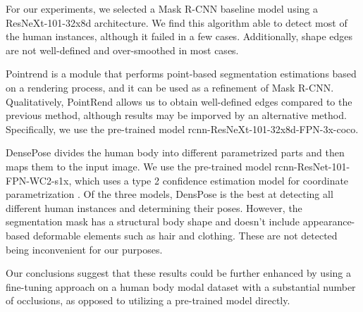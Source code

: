 \documentclass[]{interact}
\theoremstyle{plain}%
\theoremstyle{definition}
\theoremstyle{remark}
\begin{document}

For our experiments, we selected a Mask R-CNN baseline model using a ResNeXt-101-32x8d architecture. We find this algorithm able to detect most of the human instances, although it failed in a few cases. Additionally, shape edges are not well-defined and over-smoothed in most cases.

Pointrend \citep{kirillov2019pointrend} is a module that performs point-based segmentation estimations based on a rendering process, and it can be used as a refinement of Mask R-CNN. Qualitatively, PointRend allows us to obtain well-defined edges compared to the previous method, although results may be imporved by an alternative method. Specifically, we use the pre-trained model rcnn-ResNeXt-101-32x8d-FPN-3x-coco.

DensePose \citep{Guler2018DensePose} divides the human body into different parametrized parts and then maps them to the input image. We use the pre-trained model rcnn-ResNet-101-FPN-WC2-s1x, which uses a type 2 confidence estimation model for coordinate parametrization \citep{NEURIPS2019_53fde96f}. Of the three models, DensPose is the best at detecting all different human instances and determining their poses. However, the segmentation mask has a structural body shape and doesn't include appearance-based deformable elements such as hair and clothing. These are not detected being inconvenient for our purposes.

Our conclusions suggest that these results could be further enhanced by using a fine-tuning approach on a human body modal dataset with a substantial number of occlusions, as opposed to utilizing a pre-trained model directly.
\end{document}
